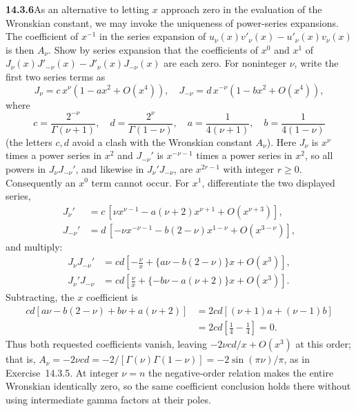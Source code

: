 \par\bigskip
\noindent\textbf{14.3.6}\quad As an alternative to letting $x$ approach
zero in the evaluation of the Wronskian constant, we may invoke the
uniqueness of power-series expansions. The coefficient of $x^{-1}$ in
the series expansion of $u_{\nu}(x)v'_{\nu}(x)-u'_{\nu}(x)v_{\nu}(x)$
is then $A_{\nu}$. Show by series expansion that the coefficients of
$x^{0}$ and $x^{1}$ of
$J_{\nu}(x)J'_{-\nu}(x)-J'_{\nu}(x)J_{-\nu}(x)$ are each zero.
\solution
For noninteger $\nu$, write the first two series terms as
\[
J_\nu=c\,x^\nu(1-ax^2+O(x^4)),\quad
J_{-\nu}=d\,x^{-\nu}(1-bx^2+O(x^4)),
\]
where
\[
c=\frac{2^{-\nu}}{\Gamma(\nu+1)},\quad
d=\frac{2^\nu}{\Gamma(1-\nu)},\quad
a=\frac1{4(\nu+1)},\quad b=\frac1{4(1-\nu)}
\]
(the letters $c,d$ avoid a clash with the Wronskian constant
$A_\nu$). Here $J_\nu$ is $x^\nu$ times a power series in $x^2$ and
$J_{-\nu}'$ is $x^{-\nu-1}$ times a power series in $x^2$, so all
powers in $J_\nu J_{-\nu}'$, and likewise in $J_\nu'J_{-\nu}$, are
$x^{2r-1}$ with integer $r\ge0$.
Consequently an $x^0$ term cannot occur. For $x^1$, differentiate
the two displayed series,
\begin{align*}
J_\nu'&=c\,[\nu x^{\nu-1}-a(\nu+2)x^{\nu+1}+O(x^{\nu+3})],\\
J_{-\nu}'&=d\,[-\nu x^{-\nu-1}-b(2-\nu)x^{1-\nu}+O(x^{3-\nu})],
\end{align*}
and multiply:
\begin{align*}
J_\nu J_{-\nu}'
&=cd\left[-\frac\nu x+
\{a\nu-b(2-\nu)\}x+O(x^3)\right],\\
J_\nu'J_{-\nu}
&=cd\left[\frac\nu x+
\{-b\nu-a(\nu+2)\}x+O(x^3)\right].
\end{align*}
Subtracting, the $x$ coefficient is
\begin{align*}
cd[a\nu-b(2-\nu)+b\nu+a(\nu+2)]
&=2cd[(\nu+1)a+(\nu-1)b]\\
&=2cd\left[\frac14-\frac14\right]=0.
\end{align*}
Thus both requested coefficients vanish, leaving
$-2\nu cd/x+O(x^3)$ at this order; that is,
$A_\nu=-2\nu cd=-2/[\Gamma(\nu)\Gamma(1-\nu)]=-2\sin(\pi\nu)/\pi$,
as in Exercise~14.3.5. At integer $\nu=n$ the
negative-order relation makes the entire Wronskian identically
zero, so the same coefficient conclusion holds there without
using intermediate gamma factors at their poles.

